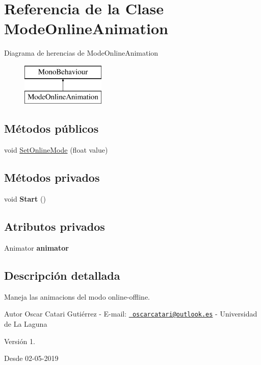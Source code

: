 \hypertarget{class_mode_online_animation}{}\section{Referencia de la Clase Mode\+Online\+Animation}
\label{class_mode_online_animation}
Diagrama de herencias de Mode\+Online\+Animation\begin{figure}[H]
\begin{center}
\leavevmode
\includegraphics[height=2.000000cm]{class_mode_online_animation}
\end{center}
\end{figure}
\subsection*{Métodos públicos}
\begin{DoxyCompactItemize}
\item 
void \mbox{\hyperlink{class_mode_online_animation_adfb83f8ce5c4c077045b68f876b5334e}{Set\+Online\+Mode}} (float value)
\end{DoxyCompactItemize}
\subsection*{Métodos privados}
\begin{DoxyCompactItemize}
\item 
\mbox{\label{class_mode_online_animation_a1ee76089af380bf277bbda2188f004ce}} 
void {\bfseries Start} ()
\end{DoxyCompactItemize}
\subsection*{Atributos privados}
\begin{DoxyCompactItemize}
\item 
\mbox{\label{class_mode_online_animation_a5c2e34488f91eb247f99ce507e8e249c}} 
Animator {\bfseries animator}
\end{DoxyCompactItemize}


\subsection{Descripción detallada}
Maneja las animacions del modo online-\/offline. \begin{DoxyAuthor}{Autor}
Oscar Catari Gutiérrez -\/ E-\/mail\+: \href{mailto:oscarcatari@outlook.es}{\texttt{ oscarcatari@outlook.\+es}} -\/ Universidad de La Laguna 
\end{DoxyAuthor}
\begin{DoxyVersion}{Versión}
1. 
\end{DoxyVersion}
\begin{DoxySince}{Desde}
02-\/05-\/2019 
\end{DoxySince}


